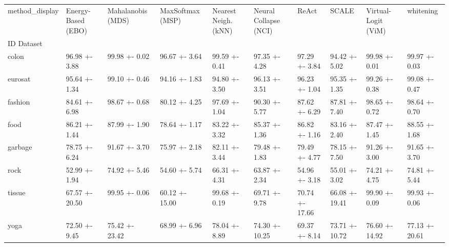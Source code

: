 \begin{tabular}{llllllllll}
\toprule
method_display & Energy-Based (EBO) & Mahalanobis (MDS) & MaxSoftmax (MSP) & Nearest Neigh. (kNN) & Neural Collapse (NCI) & ReAct & SCALE & Virtual-Logit (ViM) & whitening \\
ID Dataset &  &  &  &  &  &  &  &  &  \\
\midrule
colon & 96.98 +- 3.88 & 99.98 +- 0.02 & 96.67 +- 3.64 & 99.59 +- 0.41 & 97.35 +- 4.28 & 97.29 +- 3.84 & 94.42 +- 5.02 & 99.98 +- 0.01 & 99.97 +- 0.03 \\
eurosat & 95.64 +- 1.34 & 99.10 +- 0.46 & 94.16 +- 1.83 & 94.80 +- 3.50 & 96.13 +- 3.51 & 96.23 +- 1.04 & 95.35 +- 1.35 & 99.26 +- 0.38 & 99.08 +- 0.47 \\
fashion & 84.61 +- 6.98 & 98.67 +- 0.68 & 80.12 +- 4.25 & 97.69 +- 1.04 & 90.30 +- 5.77 & 87.62 +- 6.29 & 87.81 +- 7.40 & 98.65 +- 0.72 & 98.64 +- 0.70 \\
food & 86.21 +- 1.44 & 87.99 +- 1.90 & 78.64 +- 1.17 & 83.22 +- 3.32 & 85.37 +- 1.36 & 86.82 +- 1.16 & 83.16 +- 2.40 & 87.47 +- 1.45 & 88.55 +- 1.68 \\
garbage & 78.75 +- 6.24 & 91.67 +- 3.70 & 75.97 +- 2.18 & 82.11 +- 3.44 & 79.48 +- 1.83 & 79.49 +- 4.77 & 78.15 +- 7.50 & 91.26 +- 3.00 & 91.65 +- 3.70 \\
rock & 52.99 +- 1.94 & 74.92 +- 5.46 & 54.60 +- 5.74 & 66.31 +- 4.31 & 63.87 +- 2.34 & 54.96 +- 3.18 & 55.01 +- 3.02 & 74.21 +- 4.75 & 74.81 +- 5.44 \\
tissue & 67.57 +- 20.50 & 99.95 +- 0.06 & 60.12 +- 15.00 & 99.68 +- 0.19 & 69.71 +- 9.78 & 70.74 +- 17.66 & 66.08 +- 19.41 & 99.90 +- 0.09 & 99.93 +- 0.06 \\
yoga & 72.50 +- 9.45 & 75.42 +- 23.42 & 68.99 +- 6.96 & 78.04 +- 8.89 & 74.30 +- 10.25 & 69.37 +- 8.14 & 73.71 +- 10.72 & 76.60 +- 14.92 & 77.13 +- 20.61 \\
\bottomrule
\end{tabular}
